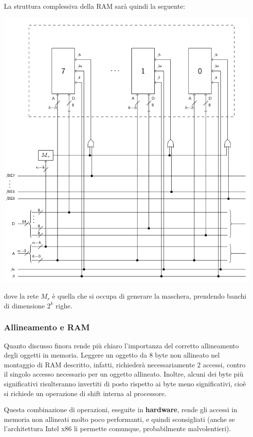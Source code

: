 \documentclass[a4paper,11pt]{article}
\begin{document}
\noindent
\begin{minipage}{\textwidth}
La struttura complessiva della RAM sarà quindi la seguente:
\begin{center}
	\includegraphics[scale=0.6]{../figures/ram.png}
\end{center}
dove la rete $M_r$ è quella che si occupa di generare la maschera, prendendo banchi di dimensione $2^k$ righe.
\end{minipage}

\subsubsection{Allineamento e RAM}
Quanto discusso finora rende più chiaro l'importanza del corretto allineamento degli oggetti in memoria.
Leggere un oggetto da 8 byte non allineato nel montaggio di RAM descritto, infatti, richiederà necessariamente 2 accessi, contro il singolo accesso necessario per un oggetto allineato.
Inoltre, alcuni dei byte più significativi risulteranno invertiti di posto rispetto ai byte meno significativi, cioè si richiede un operazione di shift interna al processore.

Questa combinazione di operazioni, eseguite in \textbf{hardware}, rende gli accessi in memoria non allineati molto poco performanti, e quindi sconsigliati (anche se l'architettura Intel x86 li permette comunque, probabilmente malvolentieri).
\end{document}
